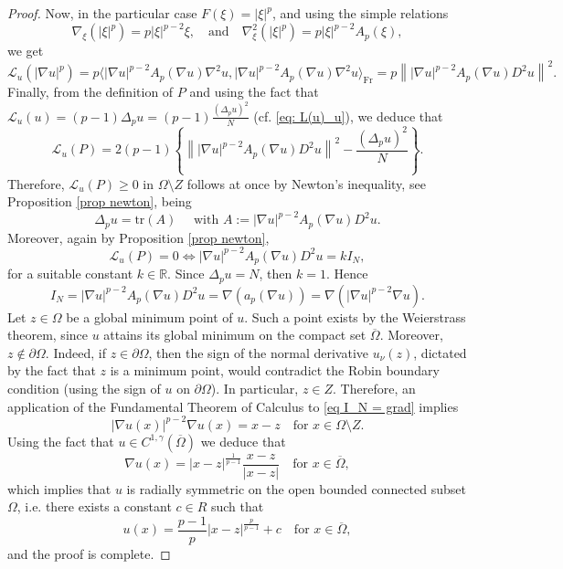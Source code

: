\documentclass[10pt,a4paper, reqno]{amsart}
\numberwithin{equation}{section}
\newcommand{\R}{\mathbb{R}}
\begin{document}
\begin{proof}
    Now, in the particular case $F(\xi)= |\xi|^p$, and using the simple relations
    \begin{equation*}
        \nabla_\xi (|\xi|^p)=p|\xi|^{p-2} \xi,
        \quad\text{and} \quad
        \nabla^2_\xi (|\xi|^p) = p|\xi|^{p-2} A_p(\xi),
    \end{equation*}
    we get
    \begin{equation*}
        \mathcal{L}_u(|\nabla u|^{p}) = p \langle |\nabla u|^{p-2} A_p(\nabla u) \nabla^2 u, |\nabla u|^{p-2} A_p(\nabla u) \nabla^2 u \rangle_{\mathrm{Fr}} = p  \left\||\nabla u|^{p-2}A_p(\nabla u)D^2u \right\|^2.
    \end{equation*}
    Finally, from the definition of $P$ and using the fact that $\mathcal{L}_u(u) = (p-1) \Delta_p u = (p-1) \frac{(\Delta_p u)^2}{N}$ (cf. \eqref{eq: L(u)_u}), we deduce that
    \begin{equation*}
        \mathcal{L}_u(P) = 2(p-1) \left\{ \left\||\nabla u|^{p-2}A_p(\nabla u)D^2u \right\|^2 - \frac{(\Delta_p u)^2}{N} \right\}.
    \end{equation*}
    Therefore, $\mathcal{L}_u(P) \geq 0$ in $\Omega \setminus Z$ follows at once by Newton's inequality, see Proposition \ref{prop newton}, being 
    \[
    \Delta_p u = \mathrm{tr}(A) \quad \text{ with } A:= |\nabla u|^{p-2}A_p(\nabla u)D^2u.
    \]
    Moreover, again by Proposition \ref{prop newton}, 
    \[
    \mathcal{L}_u(P) = 0 \iff |\nabla u|^{p-2}A_p(\nabla u)D^2u = k I_N,
    \]
    for a suitable constant $k \in \R$. Since $\Delta_p u = N$, then $k = 1$. Hence
    \begin{equation}\label{eq I_N = grad}
        I_N = |\nabla u|^{p-2}A_p(\nabla u)D^2u = \nabla ( a_p(\nabla u) ) = \nabla ( |\nabla u|^{p-2} \nabla u). 
    \end{equation}
    Let $z \in \Omega$ be a global minimum point of $u$. Such a point exists by the Weierstrass theorem, since $u$ attains its global minimum on the compact set $\overline{\Omega}$. Moreover, $z \notin \partial\Omega$. Indeed, if $z \in \partial\Omega$, then the sign of the normal derivative $u_\nu(z)$, dictated by the fact that $z$ is a minimum point, would contradict the Robin boundary condition (using the sign of $u$ on $\partial\Omega$). In particular, $z \in Z$. Therefore, an application of the Fundamental Theorem of Calculus to \eqref{eq I_N = grad} implies
    \[
    |\nabla u(x)|^{p-2} \nabla u(x) = x-z \quad \text{for } x \in \Omega \setminus Z.
    \]
    Using the fact that $u \in C^{1,\gamma}(\overline{\Omega})$ we deduce that
    \[
    \nabla u(x) = |x-z|^{\frac{1}{p-1}} \frac{x-z}{|x-z|} \quad \text{for } x \in \overline{\Omega},
    \]
    which implies that $u$ is radially symmetric on the open bounded connected subset $\Omega$, i.e. there exists a constant $c \in R$ such that
    \[
    u(x) = \frac{p-1}{p} |x-z|^{\frac{p}{p-1}} + c \quad \text{for } x \in \overline{\Omega},
    \]
    and the proof is complete.
    \end{proof}
\end{document}
